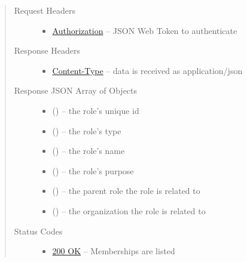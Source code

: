 \documentclass[letterpaper,10pt,english]{sphinxmanual}
\begin{document}
\begin{fulllineitems}
\begin{quote}
\begin{description}
\begin{itemize}
\end{itemize}

\item[{Request Headers}] \leavevmode\begin{itemize}
\item {} 
\href{http://tools.ietf.org/html/rfc7235\#section-4.2}{Authorization} -- JSON Web Token to authenticate

\end{itemize}

\item[{Response Headers}] \leavevmode\begin{itemize}
\item {} 
\href{http://tools.ietf.org/html/rfc7231\#section-3.1.1.5}{Content-Type} -- data is received as application/json

\end{itemize}

\item[{Response JSON Array of Objects}] \leavevmode\begin{itemize}
\item {} 
 () -- the role's unique id

\item {} 
 () -- the role's type

\item {} 
 () -- the role's name

\item {} 
 () -- the role's purpose

\item {} 
 () -- the parent role the role is related to

\item {} 
 () -- the organization the role is related to

\end{itemize}

\item[{Status Codes}] \leavevmode\begin{itemize}
\item {} 
\href{http://www.w3.org/Protocols/rfc2616/rfc2616-sec10.html\#sec10.2.1}{200 OK} -- Memberships are listed


\end{itemize}
\end{description}
\end{quote}
\end{fulllineitems}
\end{document}
